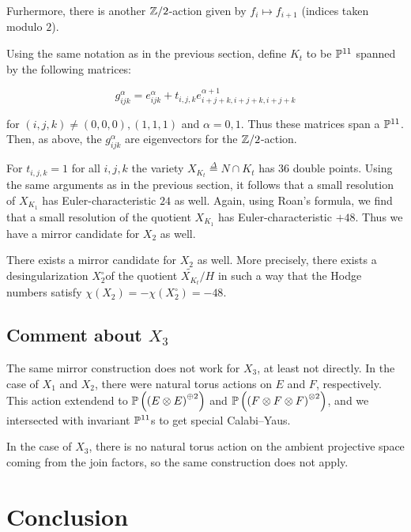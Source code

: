 Furhermore, there is another $\Z/2$-action given by $f_i \mapsto f_{i+1}$ (indices taken modulo $2$).

Using the same notation as in the previous section, define $K_t$ to be $\P^{11}$ 
spanned by the following matrices:

\begin{equation}
\label{eq:gijk}
g_{ijk}^\alpha = e_{ijk}^\alpha + t_{i,j,k} e_{i+j+k,i+j+k,i+j+k}^{\alpha+1}
\end{equation}

for $(i,j,k)\neq (0,0,0),(1,1,1)$ and $\alpha=0,1$. Thus these matrices span a $\P^{11}$. Then, as above, the $g_{ijk}^\alpha$ are eigenvectors for the $\Z/2$-action.

For $t_{i,j,k}=1$ for all $i,j,k$ the variety $X_{K_t} \stackrel \Delta =  N \cap K_t$ has $36$ double points. Using the same arguments as in the previous section, it follows that a small resolution of $X_{K_1}$ has Euler-characteristic $24$ as well. Again, using Roan's formula, we find that a small resolution of the quotient $X_{K_1}$ has Euler-characteristic $+48$. Thus we have a mirror candidate for $X_2$ as well.

\begin{proposition}
There exists a mirror candidate for $X_2$ as well. More precisely, there exists a \CY desingularization $X_2^\circ $of the quotient $\widetilde {X_{K_t}}/H$ in such a way that the Hodge numbers satisfy $\chi(X_2) = -\chi(X_2^\circ) = -48$.
\end{proposition}

\subsection{Comment about $X_3$}

The same mirror construction does not work for $X_3$, at least not directly. In the case of $X_1$ and $X_2$, there were natural torus actions on $E$ and $F$,  respectively. This action extendend to $\P\left(\left( E \otimes E\right)^{\oplus 2}\right)$ and $\P\left(\left(F \otimes F \otimes F\right)^{\otimes 2}\right)$, and we intersected with invariant $\P^{11}$s to get special Calabi--Yaus.

In the case of $X_3$, there is no natural torus action on the ambient projective space coming from the join factors, so the same construction does not apply.

\section{Conclusion}

